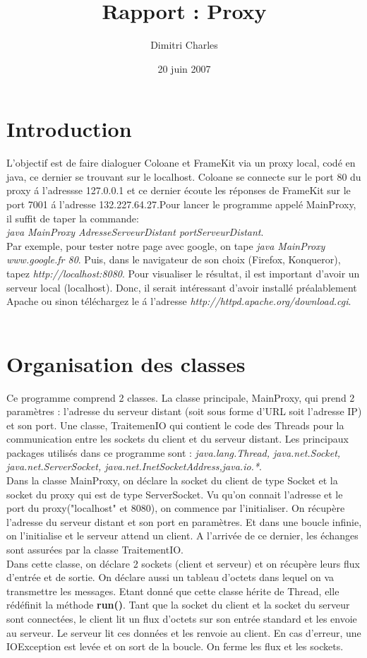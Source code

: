 \documentclass{article}
\title{Rapport : Proxy}
\author{Dimitri Charles}
\date{20 juin 2007}
\begin{document}
\section{Introduction}
\indent
	L'objectif est de faire dialoguer Coloane et FrameKit via un proxy local, cod\'e en java, ce dernier se trouvant sur le localhost. Coloane se connecte sur le port 80 du proxy \'a l'adressse 127.0.0.1 et ce dernier \'ecoute les r\'eponses de FrameKit sur le port 7001 \'a l'adresse 132.227.64.27.Pour lancer le programme appel\'e MainProxy, il suffit de taper la commande: \\\emph{java MainProxy AdresseServeurDistant portServeurDistant}.
\\
	Par exemple, pour tester notre page avec google, on tape \emph{java MainProxy www.google.fr 80}. Puis, dans le navigateur de son choix (Firefox, Konqueror), tapez \emph{http://localhost:8080}. Pour visualiser le r\'esultat, il est important d'avoir un serveur local (localhost). Donc, il serait int\'eressant d'avoir install\'e pr\'ealablement Apache ou sinon t\'el\'echargez le \'a l'adresse \emph{http://httpd.apache.org/download.cgi}.
\\
\\
\section{Organisation des classes}
	Ce programme comprend 2 classes. La classe principale, MainProxy, qui prend 2 param\`etres : l'adresse du serveur distant (soit sous forme d'URL soit l'adresse IP) et son port. Une classe, TraitemenIO qui contient le code des Threads pour la communication entre les sockets du client et du serveur distant. Les principaux packages utilis\'es dans ce programme sont : \emph{java.lang.Thread, java.net.Socket, java.net.ServerSocket, java.net.InetSocketAddress,java.io.*}.
\\
	Dans la classe MainProxy, on  d\'eclare  la socket du client de type Socket et la socket du proxy qui est de type ServerSocket. Vu qu'on connait l'adresse et le port du proxy("localhost" et 8080), on commence par l'initialiser. On r\'ecup\`ere l'adresse du serveur distant et son port en paramètres. Et dans une boucle infinie, on l'initialise et le serveur attend un client. A l'arriv\'ee de ce dernier, les \'echanges sont assur\'ees par la classe TraitementIO.
\\
	Dans cette classe, on d\'eclare 2 sockets (client et serveur) et on r\'ecup\`ere leurs flux d'entr\'ee et de sortie. On d\'eclare aussi un tableau d'octets dans lequel on va transmettre les messages. Etant donn\'e que cette classe h\'erite de Thread, elle r\'ed\'efinit la méthode \textbf{run()}. Tant que la socket du client et la socket du serveur sont connect\'ees, le client lit un flux d'octets sur son entr\'ee standard et les envoie au serveur. Le serveur lit ces donn\'ees et les renvoie au client. En cas d'erreur, une IOException est lev\'ee et on sort de la boucle. On ferme les flux et les sockets.  
\\	
\\
\end{document}

